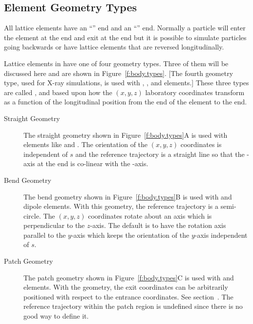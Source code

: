 \documentclass{hitec}     %
\begin{document}
{\subsection{Element Geometry Types}

All lattice elements have an ``'' end and an ``'' end. Normally a particle
will enter the element at the  end and exit at the  end but it is possible to
simulate particles going backwards or have lattice elements that are reversed longitudinally.

Lattice elements in \bmad have one of four geometry types. Three of them will be discussed here and
are shown in Figure~\ref{f:body.types}. [The fourth geometry type, used for X-ray simulations, is
used with , , and  elements.] These three types are
called ,  and  based upon how the $(x, y, z)$ laboratory coordinates
transform as a function of the longitudinal  position from the  end of the
element to the  end.
\begin{description}
\item[Straight Geometry] \Newline
The straight geometry shown in Figure~\ref{f:body.types}A is used with elements like  and
. The orientation of the $(x, y, z)$ coordinates is independent of $s$ and the
reference trajectory is a straight line so that the -axis at the  end is co-linear
with the  -axis.
\item[Bend Geometry] \Newline
The bend geometry shown in Figure~\ref{f:body.types}B is used with  and  dipole
elements. With this geometry, the reference trajectory is a semi-circle. The $(x, y, z)$ coordinates
rotate about an axis which is perpendicular to the $z$-axis. The default is to have the rotation
axis parallel to the $y$-axis which keeps the orientation of the $y$-axis independent of $s$.
\item[Patch Geometry] \Newline 
The patch geometry shown in Figure~\ref{f:body.types}C is used with  and 
elements. With the  geometry, the exit coordinates can be arbitrarily positioned with
respect to the entrance coordinates. See section~. The reference trajectory within the patch
region is undefined since there is no good way to define it.
\end{description}

\newpage

}
\end{document}
